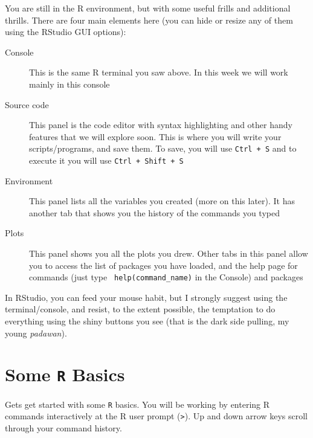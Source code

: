 You are still in the R environment, but with some useful frills and 
additional thrills. There are four main elements here (you can hide or 
resize any of them using the RStudio GUI options):

\begin{description}

\item [Console] This is the same R terminal you saw above. In this week 
we will work mainly in this console

\item [Source code] This panel is the code editor with syntax 
highlighting and other handy features that we will explore soon. This 
is where you will write your scripts/programs, and save them. To save, 
you will use {\tt Ctrl + S} and to execute it you will use {\tt Ctrl + Shift + 
S}

\item [Environment] This panel lists all the variables you created 
(more on this later). It has another tab that shows you the history of 
the commands you typed

\item [Plots] This panel shows you all the plots you drew. Other tabs 
in this panel allow you to access the list of packages
you have loaded, and the help page for commands (just type {\tt 
help(command\_name)} in the Console) and packages
\end{description}

In RStudio, you can feed your mouse habit, but I strongly suggest using 
the terminal/console, and resist, to the extent possible, the 
temptation to do everything using the shiny buttons you see (that is 
the dark side pulling, my young {\it padawan}).

\section{Some {\tt R} Basics}

Gets get started with some {\tt R} basics. You will be working by 
entering R commands interactively at the R user prompt ({\tt >}). Up 
and down arrow keys scroll through your command history. 

